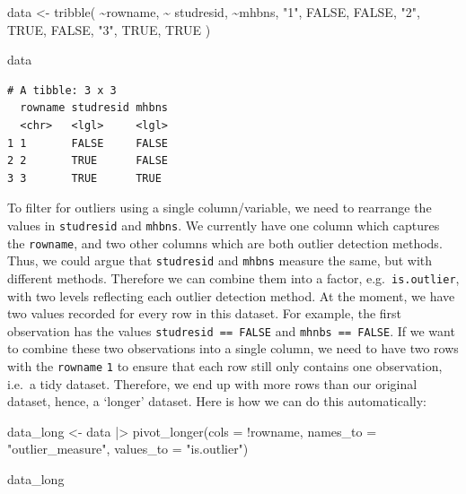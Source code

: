 \documentclass[
  letterpaper,
  DIV=11,
  numbers=noendperiod]{scrreprt}
\newenvironment{Shaded}{\begin{snugshade}}{\end{snugshade}}
\newcommand{\AttributeTok}[1]{\textcolor[rgb]{0.40,0.45,0.13}{#1}}
\newcommand{\ConstantTok}[1]{\textcolor[rgb]{0.56,0.35,0.01}{#1}}
\newcommand{\FunctionTok}[1]{\textcolor[rgb]{0.28,0.35,0.67}{#1}}
\newcommand{\NormalTok}[1]{\textcolor[rgb]{0.00,0.23,0.31}{#1}}
\newcommand{\OtherTok}[1]{\textcolor[rgb]{0.00,0.23,0.31}{#1}}
\newcommand{\SpecialCharTok}[1]{\textcolor[rgb]{0.37,0.37,0.37}{#1}}
\newcommand{\StringTok}[1]{\textcolor[rgb]{0.13,0.47,0.30}{#1}}
\begin{document}
\begin{Shaded}
\begin{Highlighting}[]
\NormalTok{data }\OtherTok{\textless{}{-}} \FunctionTok{tribble}\NormalTok{(}
  \SpecialCharTok{\textasciitilde{}}\NormalTok{rowname,   }\SpecialCharTok{\textasciitilde{}}\NormalTok{ studresid,    }\SpecialCharTok{\textasciitilde{}}\NormalTok{mhbns,}
         \StringTok{"1"}\NormalTok{,       }\ConstantTok{FALSE}\NormalTok{,     }\ConstantTok{FALSE}\NormalTok{,}
         \StringTok{"2"}\NormalTok{,        }\ConstantTok{TRUE}\NormalTok{,     }\ConstantTok{FALSE}\NormalTok{,}
         \StringTok{"3"}\NormalTok{,        }\ConstantTok{TRUE}\NormalTok{,      }\ConstantTok{TRUE}
\NormalTok{)}
\end{Highlighting}
\end{Shaded}

\begin{Shaded}
\begin{Highlighting}[]
\NormalTok{data}
\end{Highlighting}
\end{Shaded}

\begin{verbatim}
# A tibble: 3 x 3
  rowname studresid mhbns
  <chr>   <lgl>     <lgl>
1 1       FALSE     FALSE
2 2       TRUE      FALSE
3 3       TRUE      TRUE 
\end{verbatim}

To filter for outliers using a single column/variable, we need to
rearrange the values in \texttt{studresid} and \texttt{mhbns}. We
currently have one column which captures the \texttt{rowname}, and two
other columns which are both outlier detection methods. Thus, we could
argue that \texttt{studresid} and \texttt{mhbns} measure the same, but
with different methods. Therefore we can combine them into a factor,
e.g.~\texttt{is.outlier}, with two levels reflecting each outlier
detection method. At the moment, we have two values recorded for every
row in this dataset. For example, the first observation has the values
\texttt{studresid\ ==\ FALSE} and \texttt{mhnbs\ ==\ FALSE}. If we want
to combine these two observations into a single column, we need to have
two rows with the \texttt{rowname} \texttt{1} to ensure that each row
still only contains one observation, i.e.~a tidy dataset. Therefore, we
end up with more rows than our original dataset, hence, a `longer'
dataset. Here is how we can do this automatically:

\begin{Shaded}
\begin{Highlighting}[]
\NormalTok{data\_long }\OtherTok{\textless{}{-}}
\NormalTok{  data }\SpecialCharTok{|\textgreater{}}
  \FunctionTok{pivot\_longer}\NormalTok{(}\AttributeTok{cols =} \SpecialCharTok{!}\NormalTok{rowname,}
               \AttributeTok{names\_to =} \StringTok{"outlier\_measure"}\NormalTok{,}
               \AttributeTok{values\_to =} \StringTok{"is.outlier"}\NormalTok{)}

\NormalTok{data\_long}
\end{Highlighting}
\end{Shaded}
\end{document}
